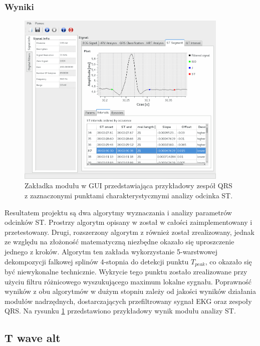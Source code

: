 \documentclass[a4paper, 11pt]{article}
\begin{document}
\subsubsection{Wyniki}
\label{sec:st_interval:results}

\begin{figure}[h!]
  \centering
  \includegraphics[width=0.9\textwidth]{include/st_gui}
  \caption{Zakładka modułu w GUI przedstawiająca przykładowy zespół QRS z
  zaznaczonymi punktami charakterystycznymi analizy odcinka ST. }
  \label{fig:st_gui}
\end{figure}

Resultatem projektu są dwa algorytmy wyznaczania i analizy parametrów odcinków ST. Prostrzy algorytm opisany w \cite{AUGUST1} został w całości zaimplementowany i przetestowany. Drugi, rozszerzony algorytm z \cite{SHEN1} również został zrealizowany, jednak ze względu na złożoność matematyczną niezbędne okazało się uproszczenie jednego z kroków. Algorytm ten zakłada wykorzystanie 5-warstwowej dekompozycji falkowej splinów 4-stopnia do detekcji punktu $T_{peak}$, co okazało się być niewykonalne technicznie. Wykrycie tego punktu zostało zrealizowane przy użyciu filtru różnicowego wyszukującego maximum lokalne sygnału. Poprawność wyników z obu algorytmów w dużym stopniu zależy od jakości wyników działania modułów nadrzędnych, dostarczających przefiltrowany sygnał EKG oraz zespoły QRS.
Na rysunku \ref{fig:st_gui} przedstawiono przykładowy wynik modułu analizy ST.


\subsection{T wave alt}
\label{sec:t_wave_alt}
\end{document}
